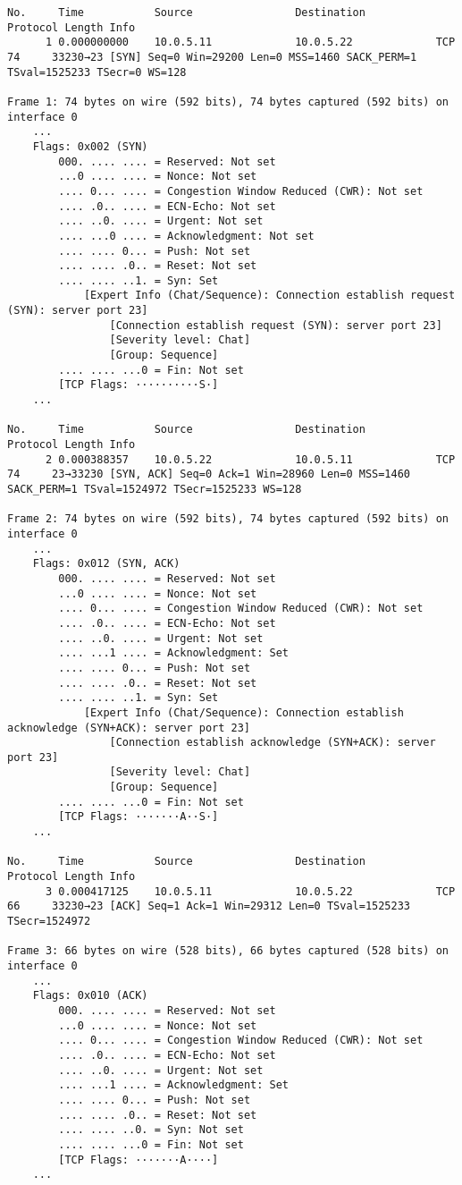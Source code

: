 \begin{verbatim}
No.     Time           Source                Destination           Protocol Length Info
      1 0.000000000    10.0.5.11             10.0.5.22             TCP      74     33230→23 [SYN] Seq=0 Win=29200 Len=0 MSS=1460 SACK_PERM=1 TSval=1525233 TSecr=0 WS=128

Frame 1: 74 bytes on wire (592 bits), 74 bytes captured (592 bits) on interface 0
	...
    Flags: 0x002 (SYN)
        000. .... .... = Reserved: Not set
        ...0 .... .... = Nonce: Not set
        .... 0... .... = Congestion Window Reduced (CWR): Not set
        .... .0.. .... = ECN-Echo: Not set
        .... ..0. .... = Urgent: Not set
        .... ...0 .... = Acknowledgment: Not set
        .... .... 0... = Push: Not set
        .... .... .0.. = Reset: Not set
        .... .... ..1. = Syn: Set
            [Expert Info (Chat/Sequence): Connection establish request (SYN): server port 23]
                [Connection establish request (SYN): server port 23]
                [Severity level: Chat]
                [Group: Sequence]
        .... .... ...0 = Fin: Not set
        [TCP Flags: ··········S·]
    ...

No.     Time           Source                Destination           Protocol Length Info
      2 0.000388357    10.0.5.22             10.0.5.11             TCP      74     23→33230 [SYN, ACK] Seq=0 Ack=1 Win=28960 Len=0 MSS=1460 SACK_PERM=1 TSval=1524972 TSecr=1525233 WS=128

Frame 2: 74 bytes on wire (592 bits), 74 bytes captured (592 bits) on interface 0
    ...
    Flags: 0x012 (SYN, ACK)
        000. .... .... = Reserved: Not set
        ...0 .... .... = Nonce: Not set
        .... 0... .... = Congestion Window Reduced (CWR): Not set
        .... .0.. .... = ECN-Echo: Not set
        .... ..0. .... = Urgent: Not set
        .... ...1 .... = Acknowledgment: Set
        .... .... 0... = Push: Not set
        .... .... .0.. = Reset: Not set
        .... .... ..1. = Syn: Set
            [Expert Info (Chat/Sequence): Connection establish acknowledge (SYN+ACK): server port 23]
                [Connection establish acknowledge (SYN+ACK): server port 23]
                [Severity level: Chat]
                [Group: Sequence]
        .... .... ...0 = Fin: Not set
        [TCP Flags: ·······A··S·]
    ...

No.     Time           Source                Destination           Protocol Length Info
      3 0.000417125    10.0.5.11             10.0.5.22             TCP      66     33230→23 [ACK] Seq=1 Ack=1 Win=29312 Len=0 TSval=1525233 TSecr=1524972

Frame 3: 66 bytes on wire (528 bits), 66 bytes captured (528 bits) on interface 0
    ...
    Flags: 0x010 (ACK)
        000. .... .... = Reserved: Not set
        ...0 .... .... = Nonce: Not set
        .... 0... .... = Congestion Window Reduced (CWR): Not set
        .... .0.. .... = ECN-Echo: Not set
        .... ..0. .... = Urgent: Not set
        .... ...1 .... = Acknowledgment: Set
        .... .... 0... = Push: Not set
        .... .... .0.. = Reset: Not set
        .... .... ..0. = Syn: Not set
        .... .... ...0 = Fin: Not set
        [TCP Flags: ·······A····]
    ...
\end{verbatim}

